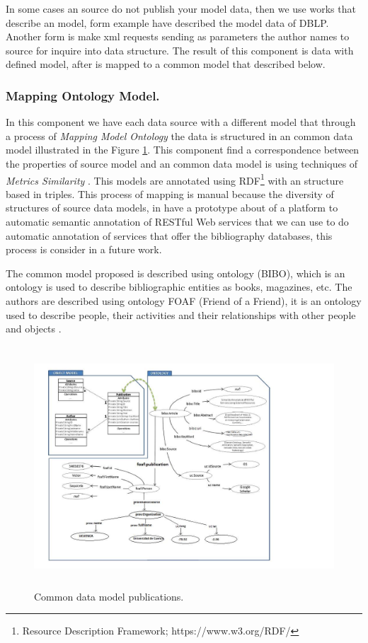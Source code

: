 \documentclass[11pt]{article}
\begin{document}
In some cases an source do not publish your model data, then we use works that describe an model, form example \cite{ley2009dblp} have described the model data of DBLP. Another form is make xml requests sending as parameters the author names to source for  inquire into  data structure. The result of this component is data with defined model, after is mapped to a common model that described below.

\subsubsection{Mapping Ontology Model.}

In this component we have each data source with a different model that through a process of \emph{Mapping Model Ontology} the data  is structured in an common data model illustrated in the Figure \ref{fig:CommonDataModel}. This component find a correspondence between the properties of  source model and an common data model is using techniques of \emph{Metrics Similarity} \cite{Charikar2002SimilarityET}. This models are annotated using RDF\footnote{Resource Description Framework; https://www.w3.org/RDF/}  with an structure based in triples. This process of mapping is manual because the diversity of structures of source data models, in \cite{Ortiz} have a prototype about of a platform to automatic semantic annotation of RESTful Web services that we can use to do automatic annotation of services that offer the bibliography databases, this process is consider in a future work.

The common model proposed is described using ontology (BIBO)\cite{Frederick}, which is an ontology is used to describe bibliographic entities as books, magazines, etc. The authors are described using ontology FOAF (Friend of a Friend), it is an ontology used to describe people, their activities and their relationships with other people and objects \cite{brickley2012foaf}. 

 \begin{figure}[ht!]
	\centering
		\includegraphics[height=9cm]{dataModelCommon.png}
	\caption{Common data model publications.}
	\label{fig:CommonDataModel}
\end{figure}
\end{document}
